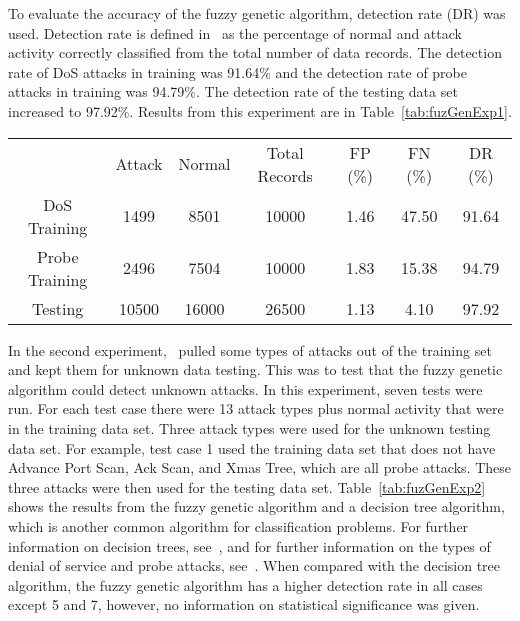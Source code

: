 \documentclass{sig-alternate}
\begin{document}
To evaluate the accuracy of the fuzzy genetic algorithm, detection rate (DR) was used. Detection rate is defined in~\cite{6496342, 6559603} as the percentage of normal and attack activity correctly classified from the total number of data records. The detection rate of DoS attacks in training was 91.64\% and the detection rate of probe attacks in training was 94.79\%. The detection rate of the testing data set increased to 97.92\%. Results from this experiment are in Table~\ref{tab:fuzGenExp1}.

\begin{table*}
\center
\caption{Results from Experiment 1, using only RLD09~\cite{6496342}.}
\vspace{0.20cm}
\begin{tabular}{ccccccc}
 & Attack & Normal & Total Records & FP (\%) & FN (\%) & DR (\%)\\
DoS Training & 1499 & 8501 & 10000 & 1.46 & 47.50 & 91.64\\
Probe Training & 2496 & 7504 & 10000 & 1.83 & 15.38 & 94.79\\
Testing & 10500 & 16000 & 26500 & 1.13 & 4.10 & 97.92\\
\end{tabular}
\label{tab:fuzGenExp1}
\center
\end{table*}

In the second experiment,~\cite{6496342} pulled some types of attacks out of the training set and kept them for unknown data testing. This was to test that the fuzzy genetic algorithm could detect unknown attacks. In this experiment, seven tests were run. For each test case there were 13 attack types plus normal activity that were in the training data set. Three attack types were used for the unknown testing data set. For example, test case 1 used the training data set that does not have Advance Port Scan, Ack Scan, and Xmas Tree, which are all probe attacks. These three attacks were then used for the testing data set. Table~\ref{tab:fuzGenExp2} shows the results from the fuzzy genetic algorithm and a decision tree algorithm, which is another common algorithm for classification problems. For further information on decision trees, see~\cite{decisionTree}, and for further information on the types of denial of service and probe attacks, see~\cite{typesOfAttacks}. When compared with the decision tree algorithm, the fuzzy genetic algorithm has a higher detection rate in all cases except 5 and 7, however, no information on statistical significance was given.
\end{document}

